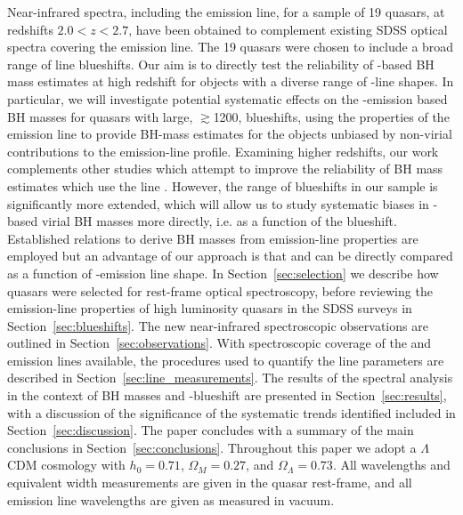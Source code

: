Near-infrared spectra, including the \ha emission line, for a sample of 19 quasars, at redshifts $2.0 < z < 2.7$, have been obtained to complement existing SDSS optical spectra covering the  emission line. 
The 19 quasars were chosen to include a broad range of  line blueshifts.
Our aim is to directly test the reliability of -based BH mass estimates at high redshift for objects with a diverse range of -line shapes.  
In particular, we will investigate potential systematic effects on the -emission based BH masses for quasars with large, $\gtrsim$1200\kms,  blueshifts, using the properties of the \ha emission line to provide BH-mass estimates for the objects unbiased by non-virial contributions to the emission-line profile.
Examining higher redshifts, our work complements other studies which attempt to improve the reliability of BH mass estimates which use the  line \citep[e.g.][]{runnoe13,denney12}. 
However, the range of  blueshifts in our sample is significantly more extended, which will allow us to study systematic biases in -based virial BH masses more directly, i.e. as a function of the  blueshift. 
Established relations to derive BH masses from emission-line properties are employed but an advantage of our approach is that  and \ha can be directly compared as a function of -emission line shape.  
In Section~\ref{sec:selection} we describe how quasars were selected for rest-frame optical spectroscopy, before reviewing the  emission-line properties of high luminosity quasars in the SDSS surveys in Section~\ref{sec:blueshifts}. 
The new near-infrared spectroscopic observations are outlined in Section~\ref{sec:observations}. 
With spectroscopic coverage of the  and \ha emission lines available, the procedures used to quantify the line parameters are described in Section~\ref{sec:line_measurements}. 
The results of the spectral analysis in the context of BH masses and -blueshift are presented in Section~\ref{sec:results}, with a discussion of the significance of the systematic trends identified included in Section~\ref{sec:discussion}.
The paper concludes with a summary of the main conclusions in Section~\ref{sec:conclusions}.
Throughout this paper we adopt a $\Lambda$CDM cosmology with $h_0=0.71$, $\Omega_M=0.27$, and $\Omega_\Lambda=0.73$. 
All wavelengths and equivalent width measurements are given in the quasar rest-frame, and all emission line wavelengths are given as measured in vacuum.

